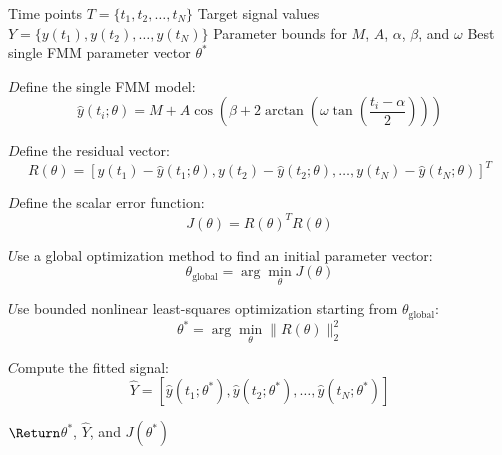 \documentclass{book}
\providecommand{\State}[1]{\ensuremath{#1}}
\begin{document}
        \begin{algorithm}[htbp]
		\caption{Single FMM Approximation of a Two-Component FMM Signal}
        \begin{algorithmic}[1]
            \Require Time points \(T = \{t_1,t_2,\dots,t_N\}\)
            \Require Target signal values \(Y = \{y(t_1),y(t_2),\dots,y(t_N)\}\)
            \Require Parameter bounds for \(M\), \(A\), \(\ensuremath{\alpha}\), \(\ensuremath{\beta}\), and \(\ensuremath{\omega}\)
            \Ensure Best single FMM parameter vector \(\ensuremath{\theta}^{*}\)
            
            \State Define the single FMM model:
            \[
                \hat{y}(t_i; \ensuremath{\theta})
                =
                M
                +
                A
                \cos
                \left(
                    \ensuremath{\beta}
                    +
                    2
                    \arctan
                    \left(
                        \ensuremath{\omega}
                        \tan
                        \left(
                            \frac{t_i-\ensuremath{\alpha}}{2}
                        \right)
                    \right)
                \right)
            \]
            
            \State Define the residual vector:
            \[
                R(\ensuremath{\theta})
                =
                \left[
                    y(t_1)-\hat{y}(t_1;\ensuremath{\theta}),
                y(t_2)-\hat{y}(t_2;\ensuremath{\theta}),
                    \dots,
                y(t_N)-\hat{y}(t_N;\ensuremath{\theta})
                \right]^{T}
            \]
            
            \State Define the scalar error function:
            \[
                J(\ensuremath{\theta})
                =
                R(\ensuremath{\theta})^{T}R(\ensuremath{\theta})
            \]
            
            \State Use a global optimization method to find an initial parameter vector:
            \[
                \ensuremath{\theta}_{\mathrm{global}}
                =
                \arg\min_{\ensuremath{\theta}}
                J(\ensuremath{\theta})
            \]
            
            \State Use bounded nonlinear least-squares optimization starting from \(\ensuremath{\theta}_{\mathrm{global}}\):
            \[
                \ensuremath{\theta}^{*}
                =
                \arg\min_{\ensuremath{\theta}}
                \|R(\ensuremath{\theta})\|_2^2
            \]
            
            \State Compute the fitted signal:
            \[
                \hat{Y}
                =
                \left[
                    \hat{y}(t_1;\ensuremath{\theta}^{*}),
                    \hat{y}(t_2;\ensuremath{\theta}^{*}),
                    \dots,
                    \hat{y}(t_N;\ensuremath{\theta}^{*})
                \right]
            \]
            
            \State \Return \(\ensuremath{\theta}^{*}\), \(\hat{Y}\), and \(J(\ensuremath{\theta}^{*})\)
        \end{algorithmic}
        \end{algorithm}
    
\end{document}

